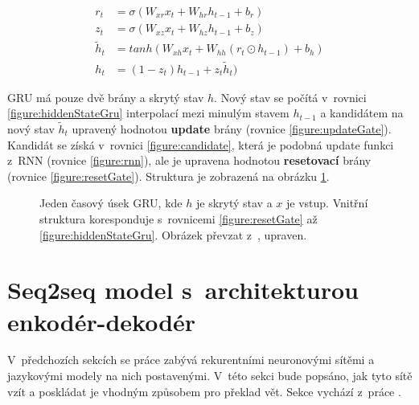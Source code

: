 \begin{align}
    r_{t}&=\sigma(W_{xr}x_{t}+W_{hr}h_{t-1}+b_{r}) \label{figure:resetGate} \\
    z_{t}&=\sigma(W_{xz}x_{t}+W_{hz}h_{t-1}+b_{z}) \label{figure:updateGate} \\
    \tilde{h}_{t}&=tanh(W_{xh}x_t + W_{hh}(r_t \odot h_{t-1}) + b_h) \label{figure:candidate} \\
    h_{t}&=(1 - z_t)h_{t-1} + z_{t}\tilde{h}_{t}) \label{figure:hiddenStateGru}
\end{align}

GRU má pouze dvě brány a skrytý stav $h$. Nový stav se počítá v~rovnici \ref{figure:hiddenStateGru} interpolací mezi minulým stavem $h_{t-1}$ a kandidátem na nový stav $\tilde{h}_{t}$ upravený hodnotou \textbf{update} brány (rovnice \ref{figure:updateGate}). Kandidát se získá v~rovnici \ref{figure:candidate}, která je podobná update funkci z~RNN (rovnice \ref{figure:rnn}), ale je upravena hodnotou \textbf{resetovací} brány (rovnice \ref{figure:resetGate}). Struktura je zobrazená na obrázku \ref{img:GRU}.


\begin{figure}[H]
    \begin{center}
    \end{center}
	\caption{Jeden časový úsek GRU, kde $h$ je skrytý stav a $x$ je vstup. Vnitřní struktura koresponduje s~rovnicemi \ref{figure:resetGate} až \ref{figure:hiddenStateGru}. Obrázek převzat z~\cite{understandingLSTM}, upraven.}
	\label{img:GRU}
\end{figure}

\section{Seq2seq model s~architekturou enkodér-dekodér} \label{section:encoderdecoder}
V~předchozích sekcích se práce zabývá rekurentními neuronovými sítěmi a jazykovými modely na nich postavenými. V~této sekci bude popsáno, jak tyto sítě vzít a poskládat je vhodným způsobem pro překlad vět. Sekce vychází z~práce \cite{nmtTutorial}.

